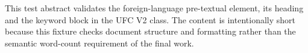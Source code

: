 This test abstract validates the foreign-language pre-textual element, its heading and the keyword block in the UFC V2 class. The content is intentionally short because this fixture checks document structure and formatting rather than the semantic word-count requirement of the final work.

